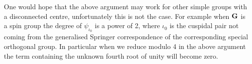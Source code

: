 \documentclass{jt-calcs}
\begin{document}
One would hope that the above argument may work for other simple groups with a disconnected centre, unfortunately this is not the case. For example when $\mathbf{G}$ is a spin group the degree of $\psi_{\iota_0}$ is a power of 2, where $\iota_0$ is the cuspidal pair not coming from the generalised Springer correspondence of the corresponding special orthogonal group. In particular when we reduce modulo 4 in the above argument the term containing the unknown fourth root of unity will become zero.


\small
\begin{spacing}{0.96}

\end{spacing}
\end{document}
